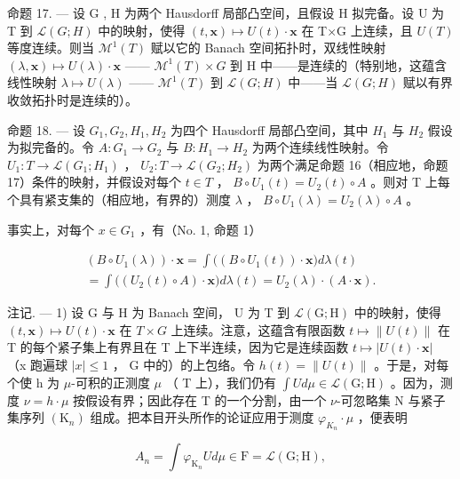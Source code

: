 命题 17. --- 设 G , H 为两个 Hausdorff 局部凸空间，且假设 H 拟完备。设 U 为 T 到 \(\mathcal{L}(G;H)\) 中的映射，使得 \((t,\mathbf{x})\mapsto U(t)\cdot \mathbf{x}\) 在 T×G 上连续，且 \(U(T)\) 等度连续。则当 \(\mathcal{M}^1 (T)\) 赋以它的 Banach 空间拓扑时，双线性映射 \((\lambda ,\mathbf{x})\mapsto U(\lambda)\cdot \mathbf{x}\) —— \(\mathcal{M}^1 (T)\times G\) 到 H 中——是连续的（特别地，这蕴含线性映射 \(\lambda \mapsto U(\lambda)\) —— \(\mathcal{M}^1 (T)\) 到 \(\mathcal{L}(G;H)\) 中——当 \(\mathcal{L}(G;H)\) 赋以有界收敛拓扑时是连续的）。

命题 18. --- 设 \(G_{1}, G_{2}, H_{1}, H_{2}\) 为四个 Hausdorff 局部凸空间，其中 \(H_{1}\) 与 \(H_{2}\) 假设为拟完备的。令 \(A : G_{1} \to G_{2}\) 与 \(B : H_{1} \to H_{2}\) 为两个连续线性映射。令 \(U_{1} : T \to \mathcal{L}(G_{1}; H_{1})\) ， \(U_{2} : T \to \mathcal{L}(G_{2}; H_{2})\) 为两个满足命题 16（相应地，命题 17）条件的映射，并假设对每个 \(t \in T\) ， \(B \circ U_{1}(t) = U_{2}(t) \circ A\) 。则对 T 上每个具有紧支集的（相应地，有界的）测度 \(\lambda\) ， \(B \circ U_{1}(\lambda) = U_{2}(\lambda) \circ A\) 。

事实上，对每个 \(x \in G_{1}\) ，有（No. 1, 命题 1）

\[
\begin{array}{c} \left(B \circ U _ {1} (\lambda)\right) \cdot \mathbf {x} = \int \Big (\left(B \circ U _ {1} (t)\right) \cdot \mathbf {x} \Big) d \lambda (t) \\ = \int \Big (\left(U _ {2} (t) \circ A\right) \cdot \mathbf {x} \Big) d \lambda (t) = U _ {2} (\lambda) \cdot (A \cdot \mathbf {x}). \end{array}
\]

注记. --- 1) 设 G 与 H 为 Banach 空间， U 为 T 到 \(\mathcal{L}(\mathrm{G};\mathrm{H})\) 中的映射，使得 \((t,\mathbf{x})\mapsto U(t)\cdot\mathbf{x}\) 在 \(T\times G\) 上连续。注意，这蕴含有限函数 \(t\mapsto\|U(t)\|\) 在 T 的每个紧子集上有界且在 T 上下半连续，因为它是连续函数 \(t \mapsto |U(t) \cdot \mathbf{x}|\) （x 跑遍球 \(|x| \leqslant 1\) ， G 中的）的上包络。令 \(h(t) = \|U(t)\|\) 。于是，对每个使 h 为 \(\mu\)-可积的正测度 \(\mu\) （ T 上），我们仍有 \(\int U d\mu \in \mathcal{L}(\mathrm{G};\mathrm{H})\) 。因为，测度 \(\nu = h \cdot \mu\) 按假设有界；因此存在 T 的一个分割，由一个 \(\nu\)-可忽略集 N 与紧子集序列 \((\mathrm{K}_{n})\) 组成。把本目开头所作的论证应用于测度 \(\varphi_{K_{n}} \cdot \mu\) ，便表明

\[
A _ {n} = \int \varphi_ {\mathrm{K} _ {n}} U d \mu \in \mathrm{F} = \mathcal {L} (\mathrm{G}; \mathrm{H}),
\]

